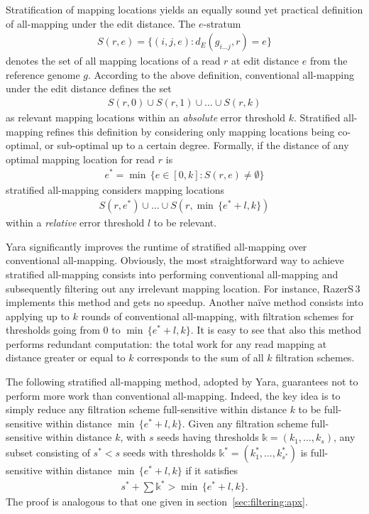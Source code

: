 Stratification of mapping locations yields an equally sound yet practical definition of all-mapping under the edit distance.
The $e$-stratum
\begin{eqnarray}
S(r,e) = \{ (i,j,e) : d_E(g_{i \dots j},r) = e\}
\end{eqnarray}
denotes the set of all mapping locations of a read $r$ at edit distance $e$ from the reference genome $g$.
According to the above definition, conventional all-mapping under the edit distance defines the set
\begin{eqnarray}
S(r,0) \cup S(r,1) \cup \dots \cup S(r,k)
\end{eqnarray}
as relevant mapping locations within an \emph{absolute} error threshold $k$.
Stratified all-mapping refines this definition by considering only mapping locations being co-optimal, or sub-optimal up to a certain degree.
Formally, if the distance of any optimal mapping location for read $r$ is
\begin{eqnarray}
e^* = \min \,\{ e \in [0,k] : S(r,e) \neq \emptyset \}
\end{eqnarray}
stratified all-mapping considers mapping locations
\begin{eqnarray}
S(r,e^*) \cup \dots \cup S(r,\min \,\{ e^*+l, k\})
\end{eqnarray}
within a \emph{relative} error threshold $l$ to be relevant.

Yara significantly improves the runtime of stratified all-mapping over conventional all-mapping.
Obviously, the most straightforward way to achieve stratified all-mapping consists into performing conventional all-mapping and subsequently filtering out any irrelevant mapping location.
For instance, RazerS\,3 implements this method and gets no speedup.
Another na\"ive method consists into applying up to $k$ rounds of conventional all-mapping, with filtration schemes for thresholds going from $0$ to $\min \,\{ e^*+l, k\}$.
It is easy to see that also this method performs redundant computation: the total work for any read mapping at distance greater or equal to $k$ corresponds to the sum of all $k$ filtration schemes.

The following stratified all-mapping method, adopted by Yara, guarantees not to perform more work than conventional all-mapping.
Indeed, the key idea is to simply reduce any filtration scheme full-sensitive within distance $k$ to be full-sensitive within distance $\min \,\{ e^*+l, k\}$.
Given any filtration scheme full-sensitive within distance $k$, with $s$ seeds having thresholds $\mathbb{k}=(k_1,\dots,k_s)$, any subset consisting of $s^* < s$ seeds with thresholds $\mathbb{k^*}=(k^{*}_{1},\dots,k^{*}_{s^*})$ is full-sensitive within distance $\min \,\{ e^*+l, k\}$ if it satisfies
\begin{eqnarray}
s^* + \sum \mathbb{k^*} > \min \,\{ e^*+l, k\}.
\end{eqnarray}
The proof is analogous to that one given in section~\ref{sec:filtering:apx}.

